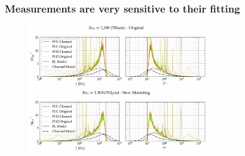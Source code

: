\documentclass[aspectratio=169,9pt]{beamer}
\begin{document}



\begin{frame}
  \frametitle{Measurements are very sensitive to their fitting}
  \begin{figure}
  \centering
    \includegraphics[width=0.7\textwidth]{remount_test/original_cleaned.png}
    \includegraphics[width=0.7\textwidth]{remount_test/new_mount_cleaned.png}
  \end{figure}

\end{frame}
\end{document}
